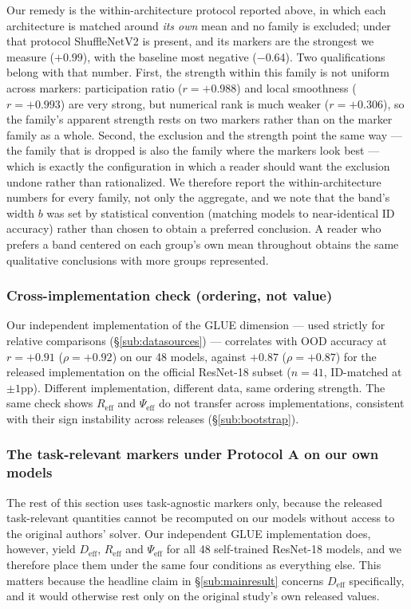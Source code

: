 \documentclass[10pt]{article} %
\newcommand{\srcref}[1]{\S\ref{#1}}
\begin{document}
Our remedy is the within-architecture protocol reported above, in which each architecture is matched around \emph{its own} mean and no family is excluded; under that protocol ShuffleNetV2 is present, and its markers are the strongest we measure ($+0.99$), with the baseline most negative ($-0.64$). Two qualifications belong with that number. First, the strength within this family is not uniform across markers: participation ratio ($r=+0.988$) and local smoothness ($r=+0.993$) are very strong, but numerical rank is much weaker ($r=+0.306$), so the family's apparent strength rests on two markers rather than on the marker family as a whole. Second, the exclusion and the strength point the same way --- the family that is dropped is also the family where the markers look best --- which is exactly the configuration in which a reader should want the exclusion undone rather than rationalized. We therefore report the within-architecture numbers for every family, not only the aggregate, and we note that the band's width $b$ was set by statistical convention (matching models to near-identical ID accuracy) rather than chosen to obtain a preferred conclusion. A reader who prefers a band centered on each group's own mean throughout obtains the same qualitative conclusions with more groups represented.

\subsubsection{Cross-implementation check (ordering, not value)}
\label{subs:crossimpl}

Our independent implementation of the GLUE dimension --- used strictly for relative comparisons (\srcref{sub:datasources}) --- correlates with OOD accuracy at $r=+0.91$ ($\rho=+0.92$) on our 48 models, against $+0.87$ ($\rho=+0.87$) for the released implementation on the official ResNet-18 subset ($n=41$, ID-matched at $\pm1$pp). Different implementation, different data, same ordering strength. The same check shows $R_{\mathrm{eff}}$ and $\Psi_{\mathrm{eff}}$ do not transfer across implementations, consistent with their sign instability across releases (\srcref{sub:bootstrap}).

\subsubsection{The task-relevant markers under Protocol A on our own models}
\label{subs:glueown}

The rest of this section uses task-agnostic markers only, because the released task-relevant quantities cannot be recomputed on our models without access to the original authors' solver. Our independent GLUE implementation does, however, yield $D_{\mathrm{eff}}$, $R_{\mathrm{eff}}$ and $\Psi_{\mathrm{eff}}$ for all 48 self-trained ResNet-18 models, and we therefore place them under the same four conditions as everything else. This matters because the headline claim in \srcref{sub:mainresult} concerns $D_{\mathrm{eff}}$ specifically, and it would otherwise rest only on the original study's own released values.
\end{document}
